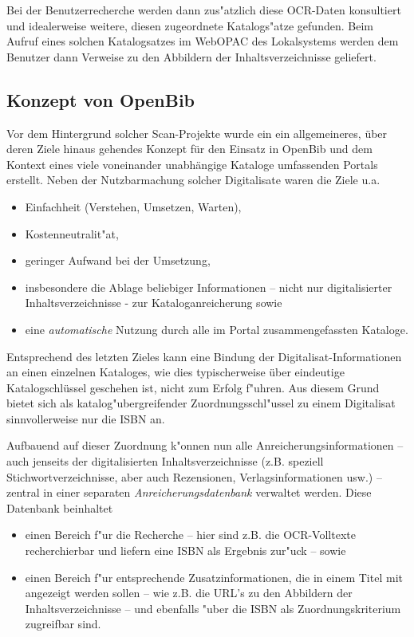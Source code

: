 \documentclass[11pt, twoside, a4paper, BCOR8mm, DIV12, bibtotoc,idxtotoc]{scrbook}
\begin{document}
Bei der Benutzerrecherche werden dann zus"atzlich diese OCR-Daten
konsultiert und idealerweise weitere, diesen zugeordnete Katalogs"atze
gefunden. Beim Aufruf eines solchen Katalogsatzes im WebOPAC des
Lokalsystems werden dem Benutzer dann Verweise zu den Abbildern der
Inhaltsverzeichnisse geliefert.

\subsection{Konzept von OpenBib}

Vor dem Hintergrund solcher Scan-Projekte wurde ein ein allgemeineres,
über deren Ziele hinaus gehendes Konzept für den Einsatz in OpenBib und
dem Kontext eines viele voneinander un\-ab\-hängige Kataloge umfassenden
Portals erstellt. Neben der Nutzbarmachung solcher Digitalisate waren
die Ziele u.a.

\begin{itemize}
\item Einfachheit (Verstehen, Umsetzen, Warten),
\item Kostenneutralit"at,
\item geringer Aufwand bei der Umsetzung,
\item insbesondere die Ablage beliebiger Informationen -- nicht nur
  digitalisierter Inhalts\-ver\-zeich\-nisse - zur Kataloganreicherung sowie
\item eine \emph{automatische} Nutzung durch alle im Portal
  zusammengefassten Kataloge.
\end{itemize}

Entsprechend des letzten Zieles kann eine Bindung der
Digitalisat-Informationen an einen einzelnen Kataloges, wie dies
typischerweise über eindeutige Katalogschlüssel geschehen ist, nicht
zum Erfolg f"uhren.  Aus diesem Grund bietet sich als
katalog"ubergreifender Zuordnungsschl"ussel zu einem Digitalisat
sinnvollerweise nur die ISBN an.

Aufbauend auf dieser Zuordnung k"onnen nun alle
Anreicherungsinformationen -- auch jenseits der digitalisierten
Inhaltsverzeichnisse (z.B. speziell Stichwortverzeichnisse, aber auch
Rezensionen, Verlagsinformationen usw.) -- zentral in einer separaten
\emph{Anreicherungsdatenbank} verwaltet werden. Diese Datenbank beinhaltet

\begin{itemize}
\item einen Bereich f"ur die Recherche -- hier sind z.B. die
  OCR-Volltexte recherchierbar und liefern eine ISBN als Ergebnis
  zur"uck -- sowie
\item einen Bereich f"ur entsprechende Zusatzinformationen, die in
  einem Titel mit angezeigt werden sollen -- wie z.B. die URL's zu den
  Abbildern der Inhaltsverzeichnisse -- und ebenfalls "uber die ISBN
  als Zuordnungskriterium zugreifbar sind.
\end{itemize}
\end{document}
